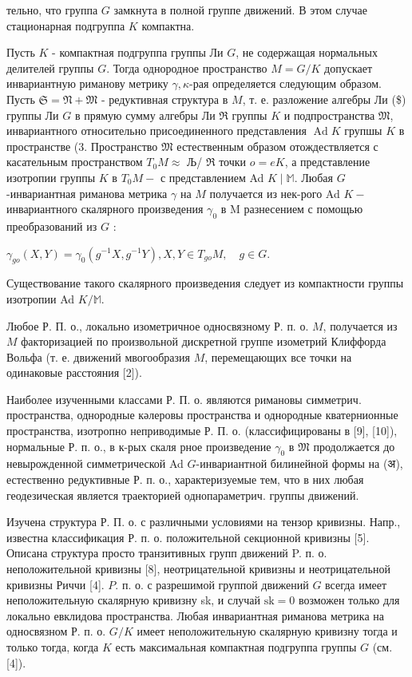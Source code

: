 \documentclass[10pt]{article}
\begin{document}
тельно, что группа $G$ замкнута в полной группе движений. В этом случае стационарная подгруппа $K$ компактна.



Пусть $K$ - компактная подгруппа группы Ли $G$, не содержащая нормальных делителей группы $G$. Тогда однородное пространство $M=G / K$ допускает инвариантную риманову метрику $\gamma, \kappa$-рая определяется следующим образом. Пусть $\mathfrak{S}=\mathfrak{N}+\mathfrak{M}$ - редуктивная структура в $M$, т. е. разложение алгебры Ли (\$) группы Ли $G$ в прямую сумму алгебры Ли $\Re$ группы $K$ и подпространства $\mathfrak{M}$, инвариантного относительно присоединенного представления $\operatorname{Ad} K$ групшы $K$ в пространстве (3. Пространство $\mathfrak{M}$ естественным образом отождествляется с касательным пространством $T_{0} M \approx$ Љ/ $\Re$ точки $o=e K$, а представление изотропии группы $K$ в $T_{0} M-$ с представлением Ad $K \mid \mathbb{M}$. Любая $G$-инвариантная риманова метрика $\gamma$ на $M$ получается из нек-рого Ad $K-$ инвариантного скалярного произведения $\gamma_{0}$ в $\mathrm{M}$ разнесением с помощью преобразований из $G$ :



$\gamma_{g o}(X, Y)=\gamma_{0}\left(g^{-1} X, g^{-1} Y\right), X, Y \in T_{g o} M, \quad g \in G$.



Существование такого скалярного произведения следует из компактности группы изотропии Ad $K / \mathbb{M}$.



Любое Р. П. о., локально изометричное односвязному Р. п. о. $M$, получается из $M$ факторизацией по произвольной дискретной группе изометрий Клиффорда Вольфа (т. е. движений мвогообразия $M$, перемещающих все точки на одинаковые расстояния [2]).



Наиболее изученными классами Р. П. о. являются римановы симметрич. пространства, однородные кәлеровы пространства и однородные кватернионные пространства, изотропно неприводимые Р. П. о. (классифицированы в [9], [10]), нормальные Р. п. о., в к-рых скаля рное произведение $\gamma_{0}$ в $\mathfrak{M}$ продолжается до невырожденной симметрической Ad $G$-инвариантной билинейной формы на (अ), естественно редуктивные Р. п. о., характеризуемые тем, что в них любая геодезическая является траекторией однопараметрич. группы движений.



Изучена структура Р. П. о. с различными условиями на тензор кривизны. Напр., известна классификация Р. п. о. положительной секционной кривизны [5]. Описана структура просто транзитивных групп движений P. п. о. неположительной кривизны [8], неотрицательной кривизны и неотрицательной кривизны Риччи [4]. $P$. п. о. с разрешимой группой движений $G$ всегда имеет неположительную скалярную кривизну sk, и случай $\mathrm{sk}=0$ возможен только для локально евклидова пространства. Любая инвариантная риманова метрика на односвязном Р. п. о. $G / K$ имеет неположительную скалярную кривизну тогда и только тогда, когда $K$ есть максимальная компактная подгруппа группы $G$ (см. [4]).
\end{document}
